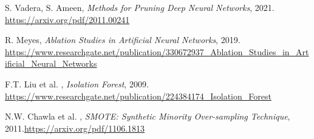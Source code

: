 \documentclass[a4paper,12pt]{report}
\begin{document}
\begin{thebibliography}{99}
		S. Vadera, S. Ameen, \emph{Methods for Pruning Deep Neural Networks}, 2021. \url{https://arxiv.org/pdf/2011.00241}
		
		R. Meyes, \emph{Ablation Studies in Artificial Neural Networks}, 2019. \url{https://www.researchgate.net/publication/330672937_Ablation_Studies_in_Artificial_Neural_Networks}
		
		F.T. Liu et al. , \emph{Isolation Forest}, 2009. \url{https://www.researchgate.net/publication/224384174_Isolation_Forest}
		
		N.W. Chawla et al. , \emph{SMOTE: Synthetic Minority Over-sampling Technique}, 2011.\url{https://arxiv.org/pdf/1106.1813}
	\end{thebibliography}
		
\end{document}
